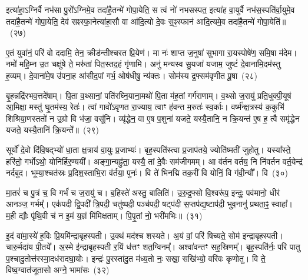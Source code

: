 इत्या॑हा॒\-ऽग्निर्वै नभ॑सा पु॒रो᳚\-ऽग्निमे॒व तदा॑है॒तन्मे॑ गोपा॒येति॒ स त्वं नो॑ नभसस्पत॒ इत्या॑ह वा॒युर्वै नभ॑स॒स्पति॑र्वा॒युमे॒व तदा॑है॒तन्मे॑ गोपा॒येति॒ देव॑ सꣴस्फा॒नेत्या॑हा॒सौ वा आ॑दि॒त्यो दे॒वः स॒ꣴ॒स्फान॑ आदि॒त्यमे॒व तदा॑है॒तन्मे॑ गोपा॒येति॑॥~(२७)\ip

{\anuvakamend[{कुसी॑द॒न्त्वन्न॑ एनमोषे॒द्यदि॑ पु॒र आ॑दि॒त्यमे॒व तदा॑है॒तन्मे॑ गोपा॒येति॑}]}

ए॒तं युवा॑नं॒ परि॑ वो ददामि॒ तेन॒ क्रीड॑न्तीश्चरत प्रि॒येण॑। मा नः॑ शाप्त ज॒नुषा॑ सुभागा रा॒यस्पोषे॑ण॒ समि॒षा म॑देम। नमो॑ महि॒म्न उ॒त चक्षु॑षे ते॒ मरु॑तां पित॒स्तद॒हं गृ॑णामि। अनु॑ मन्यस्व सु॒यजा॑ यजाम॒ जुष्टं॑ दे॒वाना॑मि॒दम॑स्तु ह॒व्यम्। दे॒वाना॑मे॒ष उ॑पना॒ह आ॑सीद॒पां गर्भ॒ ओष॑धीषु॒ न्य॑क्तः। सोम॑स्य द्र॒फ्सम॑वृणीत पू॒षा~(२८)\ip

बृ॒हन्नद्रि॑रभव॒त्तदे॑षाम्। पि॒ता व॒थ्सानां॒ पति॑रघ्नि॒याना॒मथो॑ पि॒ता म॑ह॒तां गर्ग॑राणाम्। व॒थ्सो ज॒रायु॑ प्रति॒धुक्पी॒यूष॑ आ॒मिक्षा॒ मस्तु॑ घृ॒तम॑स्य॒ रेतः॑। त्वां गावो॑\-ऽवृणत रा॒ज्याय॒ त्वाꣳ ह॑वन्त म॒रुतः॑ स्व॒र्काः। वर्ष्म॑न्क्ष॒त्रस्य॑ क॒कुभि॑ शिश्रिया॒णस्ततो॑ न उ॒ग्रो वि भ॑जा॒ वसू॑नि। व्यृ॑द्धेन॒ वा ए॒ष प॒शुना॑ यजते॒ यस्यै॒तानि॒ न क्रि॒यन्त॑ ए॒ष ह॒ त्वै समृ॑द्धेन यजते॒ यस्यै॒तानि॑ क्रि॒यन्ते᳚॥~(२९)\ip

{\anuvakamend[{पू॒षा क्रि॒यन्त॑ ए॒षो᳚\-ऽष्टौ च॑}]}

सूर्यो॑ दे॒वो दि॑वि॒षद्भ्यो॑ धा॒ता क्ष॒त्राय॑ वा॒युः प्र॒जाभ्यः॑। बृह॒स्पति॑स्त्वा प्र॒जा\-प॑तये॒ ज्योति॑ष्मतीं जुहोतु। यस्या᳚स्ते॒ हरि॑तो॒ गर्भो\-ऽथो॒ योनि॑र्\mbox{}हिर॒ण्ययी᳚। अङ्गा॒न्यह्रु॑ता॒ यस्यै॒ तां दे॒वैः सम॑जीगमम्। आ व॑र्तन वर्तय॒ नि नि॑वर्तन वर्त॒येन्द्र॑ नर्दबुद। भूम्या॒श्चत॑स्रः प्र॒दिश॒स्ताभि॒रा व॑र्तया॒ पुनः॑। वि ते॑ भिनद्मि तक॒रीं वि योनिं॒ वि ग॑वी॒न्यौ᳚। वि~(३०)\ip

मा॒तरं॑ च पु॒त्रं च॒ वि गर्भं॑ च ज॒रायु॑ च। ब॒हिस्ते॑ अस्तु॒ बालिति॑। उ॒रु॒द्र॒फ्सो वि॒श्वरू॑प॒ इन्दुः॒ पव॑मानो॒ धीर॑ आनञ्ज॒ गर्भम्᳚। एक॑पदी द्वि॒पदी᳚ त्रि॒पदी॒ चतु॑ष्पदी॒ पञ्च॑पदी॒ षट्प॑दी स॒प्तप॑द्य॒ष्टाप॑दी॒ भुव॒नानु॑ प्रथता॒ꣴ॒ स्वाहा᳚। म॒ही द्यौः पृ॑थि॒वी च॑ न इ॒मं य॒ज्ञं मि॑मिक्षताम्। पि॒पृ॒तां नो॒ भरी॑मभिः॥~(३१)\ip

{\anuvakamend[{ग॒वी॒न्यौ॑ वि चतु॑श्चत्वारिꣳशच्च}]}%

इ॒दं वा॑मा॒स्ये॑ ह॒विः प्रि॒यमि॑न्द्राबृहस्पती। उ॒क्थं मद॑श्च शस्यते। अ॒यं वां॒ परि॑ षिच्यते॒ सोम॑ इन्द्राबृहस्पती। चारु॒र्मदा॑य पी॒तये᳚। अ॒स्मे इ॑न्द्राबृहस्पती र॒यिं ध॑त्तꣳ शत॒ग्विनम्᳚। अश्वा॑वन्तꣳ सह॒स्रिणम्᳚। बृह॒स्पति॑र्नः॒ परि॑ पातु प॒श्चादु॒तोत्त॑रस्मा॒दध॑रादघा॒योः। इन्द्रः॑ पु॒रस्ता॑दु॒त म॑ध्य॒तो नः॒ सखा॒ सखि॑भ्यो॒ वरि॑वः कृणोतु। वि ते॒ विष्व॒ग्वात॑जूतासो अग्ने॒ भामा॑सः~(३२)\ip

